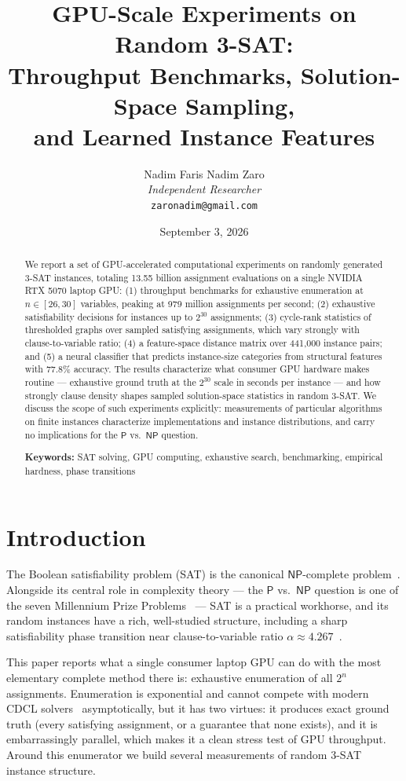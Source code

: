 \documentclass[11pt]{article}
\title{%
  \textbf{GPU-Scale Experiments on Random 3-SAT: \\
  Throughput Benchmarks, Solution-Space Sampling, \\
  and Learned Instance Features}
}
\author{
  Nadim Faris Nadim Zaro \\
  \textit{Independent Researcher} \\
  \texttt{zaronadim@gmail.com}
}
\date{September 3, 2026}
\newcommand{\SAT}{\textsf{SAT}}
\newcommand{\NP}{\textsf{NP}}
\newcommand{\PTIME}{\textsf{P}}
\begin{document}
\maketitle

\begin{abstract}
We report a set of GPU-accelerated computational experiments on randomly generated 3-\SAT{} instances, totaling 13.55 billion assignment evaluations on a single NVIDIA RTX 5070 laptop GPU: (1) throughput benchmarks for exhaustive enumeration at $n \in [26,30]$ variables, peaking at 979 million assignments per second; (2) exhaustive satisfiability decisions for instances up to $2^{30}$ assignments; (3) cycle-rank statistics of thresholded graphs over sampled satisfying assignments, which vary strongly with clause-to-variable ratio; (4) a feature-space distance matrix over 441{,}000 instance pairs; and (5) a neural classifier that predicts instance-size categories from structural features with 77.8\% accuracy. The results characterize what consumer GPU hardware makes routine --- exhaustive ground truth at the $2^{30}$ scale in seconds per instance --- and how strongly clause density shapes sampled solution-space statistics in random 3-\SAT{}. We discuss the scope of such experiments explicitly: measurements of particular algorithms on finite instances characterize implementations and instance distributions, and carry no implications for the $\PTIME$ vs.\ $\NP$ question.

\textbf{Keywords:} SAT solving, GPU computing, exhaustive search, benchmarking, empirical hardness, phase transitions
\end{abstract}

\section{Introduction}

The Boolean satisfiability problem (\SAT) is the canonical $\NP$-complete problem~\cite{Cook1971,Karp1972}. Alongside its central role in complexity theory --- the $\PTIME$ vs.\ $\NP$ question is one of the seven Millennium Prize Problems~\cite{ClayInstitute} --- \SAT{} is a practical workhorse, and its random instances have a rich, well-studied structure, including a sharp satisfiability phase transition near clause-to-variable ratio $\alpha \approx 4.267$~\cite{MezardZecchina2002}.

This paper reports what a single consumer laptop GPU can do with the most elementary complete method there is: exhaustive enumeration of all $2^n$ assignments. Enumeration is exponential and cannot compete with modern CDCL solvers~\cite{MiniSat} asymptotically, but it has two virtues: it produces exact ground truth (every satisfying assignment, or a guarantee that none exists), and it is embarrassingly parallel, which makes it a clean stress test of GPU throughput. Around this enumerator we build several measurements of random 3-\SAT{} instance structure.
\end{document}
